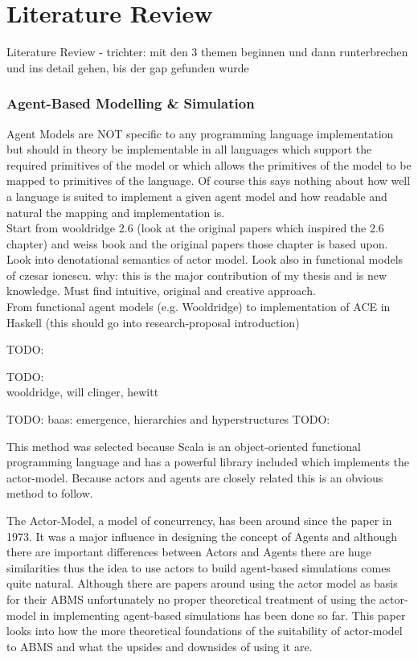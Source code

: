 \chapter{Literature Review}
Literature Review
- trichter: mit den 3 themen beginnen und dann runterbrechen und ins detail gehen, bis der gap gefunden wurde

\subsection{Agent-Based Modelling \& Simulation}
Agent Models are NOT specific to any programming language implementation but should in theory be implementable in all languages which support the required primitives of the model or which allows the primitives of the model to be mapped to primitives of the language. Of course this says nothing about how well a language is suited to implement a given agent model and how readable and natural the mapping and implementation is. \\

Start from wooldridge 2.6 (look at the original papers which inspired the 2.6 chapter) and weiss book and the original papers those chapter is based upon. Look into denotational semantics of actor model. Look also in functional models of czesar ionescu. why: this is the major contribution of my thesis and is new knowledge. Must find intuitive, original and creative approach. \\
From functional agent models (e.g. Wooldridge) to implementation of ACE in Haskell (this should go into research-proposal introduction)

TODO: \cite{Genesereth1987}

TODO: \cite{Muller1997}\\

 wooldridge,  will clinger, hewitt

TODO: baas: emergence, hierarchies and hyperstructures
TODO: \cite{baas_emergence_1997}

This method was selected because Scala is an object-oriented functional programming language and has a powerful library included which implements the actor-model. Because actors and agents are closely related this is an obvious method to follow.


The Actor-Model, a model of concurrency, has been around since the paper \cite{Hewitt_1973} in 1973. It was a major influence in designing the concept of Agents and although there are important differences between Actors and Agents there are huge similarities thus the idea to use actors to build agent-based simulations comes quite natural. Although there are papers around using the actor model as basis for their ABMS unfortunately no proper theoretical treatment of using the actor-model in implementing agent-based simulations has been done so far. This paper looks into how the more theoretical foundations of the suitability of actor-model to ABMS and what the upsides and downsides of using it are.

